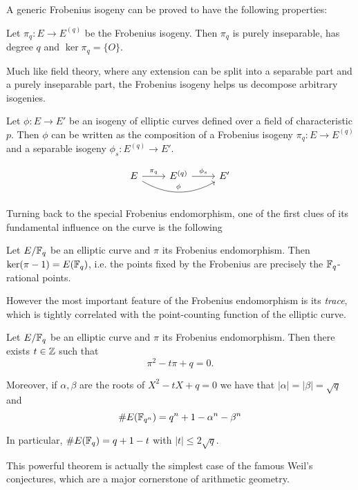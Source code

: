 A generic Frobenius isogeny can be proved to have the following properties:
\begin{proposition}
    Let $\pi_q:E\to E^{(q)}$ be the Frobenius isogeny. Then $\pi_q$ is purely inseparable, has degree $q$ and $\ker\pi_q = \{O\}$.
\end{proposition}

Much like field theory, where any extension can be split into a separable part and a purely inseparable part, the Frobenius isogeny helps us decompose arbitrary isogenies.
\begin{proposition}
    Let $\phi: E\to E'$ be an isogeny of elliptic curves defined over a field of characteristic $p$. Then $\phi$ can be written as the composition of a Frobenius isogeny $\pi_q:E\to E^{(q)}$ and a separable isogeny $\phi_s:E^{(q)}\to E'$.
    
    \[\begin{tikzcd}
        E\rar["\pi_q"] \ar[rr, bend right, "\phi"] & E^{(q)} \rar["\phi_s"] & E'
    \end{tikzcd}\]
\end{proposition}

Turning back to the special Frobenius endomorphism, one of the first clues of its fundamental influence on the curve is the following
\begin{proposition}
    Let $E/\mathbb{F}_q$ be an elliptic curve and $\pi$ its Frobenius endomorphism. Then $\ker(\pi-1) = E(\mathbb{F}_q)$, i.e. the points fixed by the Frobenius are precisely the $\mathbb{F}_q$-rational points.
\end{proposition}

However the most important feature of the Frobenius endomorphism is its \emph{trace}, which is tightly correlated with the point-counting function of the elliptic curve.

\begin{theorem}
    Let $E/\mathbb{F}_q$ be an elliptic curve and $\pi$ its Frobenius endomorphism. Then there exists $t\in\mathbb{Z}$ such that $$\pi^2-t\pi+q=0.$$
    
    Moreover, if $\alpha,\beta$ are the roots of $X^2-tX+q=0$ we have that $|\alpha|=|\beta|=\sqrt q$ and $$\# E(\mathbb{F}_{q^n}) = q^n+1-\alpha^n-\beta^n$$
    
    In particular, $\# E(\mathbb{F}_q) = q+1-t$ with $|t|\le2\sqrt q$.
\end{theorem}

This powerful theorem is actually the simplest case of the famous Weil's conjectures, which are a major cornerstone of arithmetic geometry.

